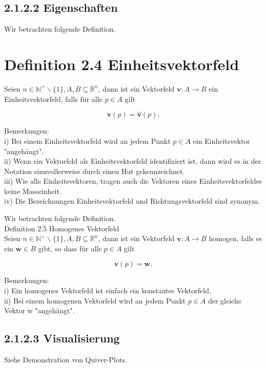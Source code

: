 \documentclass[10pt]{article}
\begin{document}
\subsection*{2.1.2.2 Eigenschaften}
Wir betrachten folgende Definition.

\section*{Definition 2.4 Einheitsvektorfeld}
Seien $n \in \mathbb{N}^{+} \backslash\{1\}, A, B \subseteq \mathbb{R}^{n}$, dann ist ein Vektorfeld $\mathbf{v}: A \rightarrow B$ ein Einheitsvektorfeld, falls für alle $p \in A$ gilt


\begin{equation*}
\mathbf{v}(p)=\hat{\mathbf{v}}(p) . \tag{2.34}
\end{equation*}


Bemerkungen:\\
i) Bei einem Einheitsvektorfeld wird an jedem Punkt $p \in A$ ein Einheitsvektor "angehängt".\\
ii) Wenn ein Vektorfeld als Einheitsvektorfeld identifiziert ist, dann wird es in der Notation sinnvollerweise durch einen Hut gekennzeichnet.\\
iii) Wie alle Einheitsvektoren, tragen auch die Vektoren eines Einheitsvektorfeldes keine Masseinheit.\\
iv) Die Bezeichnungen Einheitsvektorfeld und Richtungsvektorfeld sind synonym.

Wir betrachten folgende Definition.\\
Definition 2.5 Homogenes Vektorfeld\\
Seien $n \in \mathbb{N}^{+} \backslash\{1\}, A, B \subseteq \mathbb{R}^{n}$, dann ist ein Vektorfeld $\mathbf{v}: A \rightarrow B$ homogen, falls es ein $\mathbf{w} \in B$ gibt, so dass für alle $p \in A$ gilt


\begin{equation*}
\mathbf{v}(p)=\mathbf{w} . \tag{2.35}
\end{equation*}


Bemerkungen:\\
i) Ein homogenes Vektorfeld ist einfach ein konstantes Vektorfeld.\\
ii) Bei einem homogenen Vektorfeld wird an jedem Punkt $p \in A$ der gleiche Vektor w "angehängt".

\subsection*{2.1.2.3 Visualisierung}
Siehe Demonstration von Quiver-Plots.
\end{document}

